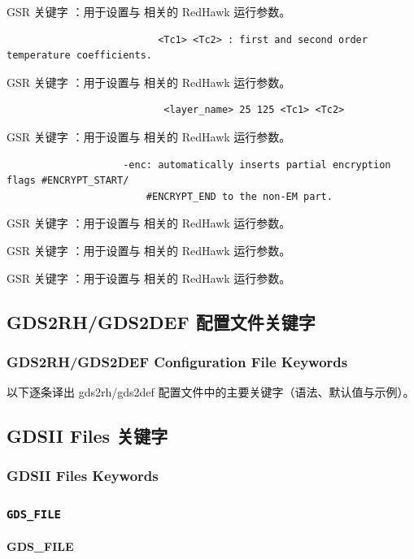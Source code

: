 GSR 关键字 ：用于设置与  相关的 RedHawk 运行参数。

\begin{lstlisting}
                          <Tc1> <Tc2> : first and second order temperature coefficients.
\end{lstlisting}

GSR 关键字 ：用于设置与  相关的 RedHawk 运行参数。

\begin{lstlisting}
                           <layer_name> 25 125 <Tc1> <Tc2>
\end{lstlisting}

GSR 关键字 ：用于设置与  相关的 RedHawk 运行参数。

\begin{lstlisting}
                    -enc: automatically inserts partial encryption flags #ENCRYPT_START/
                        #ENCRYPT_END to the non-EM part.
\end{lstlisting}

GSR 关键字 ：用于设置与  相关的 RedHawk 运行参数。

GSR 关键字 ：用于设置与  相关的 RedHawk 运行参数。

GSR 关键字 ：用于设置与  相关的 RedHawk 运行参数。

\subsection{GDS2RH/GDS2DEF 配置文件关键字}
\subsubsection*{GDS2RH/GDS2DEF Configuration File Keywords}

以下逐条译出 gds2rh/gds2def 配置文件中的主要关键字（语法、默认值与示例）。

\subsection{GDSII Files 关键字}
\subsubsection*{GDSII Files Keywords}

\subsubsection{\texttt{GDS_FILE}}
\paragraph*{GDS_FILE}

